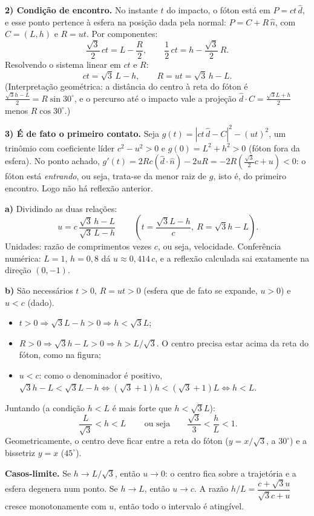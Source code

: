 \documentclass{article}%
\begin{document}
\textbf{2) Condição de encontro.} No instante $t$ do impacto, o fóton está em $P=ct\,\hat d$, e esse ponto pertence à esfera na posição dada pela normal: $P=C+R\,\hat n$, com $C=(L,h)$ e $R=ut$. Por componentes:
\[
\frac{\sqrt3}{2}\,ct=L-\frac{R}{2},\qquad \frac12\,ct=h-\frac{\sqrt3}{2}\,R .
\]
Resolvendo o sistema linear em $ct$ e $R$:
\[
ct=\sqrt3\,L-h,\qquad R=ut=\sqrt3\,h-L .
\]
(Interpretação geométrica: a distância do centro à reta do fóton é $\tfrac{\sqrt3h-L}{2}=R\sin30^\circ$, e o percurso até o impacto vale a projeção $\hat d\cdot C=\tfrac{\sqrt3L+h}{2}$ menos $R\cos30^\circ$.)

\textbf{3) É de fato o primeiro contato.} Seja $g(t)=|ct\,\hat d-C|^2-(ut)^2$, um trinômio com coeficiente líder $c^2-u^2>0$ e $g(0)=L^2+h^2>0$ (fóton fora da esfera). No ponto achado, $g'(t)=2Rc(\hat d\cdot\hat n)-2uR=-2R\left(\tfrac{\sqrt3}{2}c+u\right)<0$: o fóton está \emph{entrando}, ou seja, trata-se da menor raiz de $g$, isto é, do primeiro encontro. Logo não há reflexão anterior.

\textbf{a)} Dividindo as duas relações:
\[
\boxed{\,u=c\,\frac{\sqrt3\,h-L}{\sqrt3\,L-h}\,}
\qquad\left(t=\frac{\sqrt3L-h}{c},\ R=\sqrt3h-L\right).
\]
Unidades: razão de comprimentos vezes $c$, ou seja, velocidade. Conferência numérica: $L=1$, $h=0{,}8$ dá $u\approx0{,}414\,c$, e a reflexão calculada sai exatamente na direção $(0,-1)$.

\textbf{b)} São necessários $t>0$, $R=ut>0$ (esfera que de fato se expande, $u>0$) e $u<c$ (dado).
\begin{itemize}
\item $t>0 \Rightarrow \sqrt3L-h>0 \Rightarrow h<\sqrt3L$;
\item $R>0 \Rightarrow \sqrt3h-L>0 \Rightarrow h>L/\sqrt3$. O centro precisa estar acima da reta do fóton, como na figura;
\item $u<c$: como o denominador é positivo, $\sqrt3h-L<\sqrt3L-h \Leftrightarrow (\sqrt3+1)h<(\sqrt3+1)L \Leftrightarrow h<L$.
\end{itemize}
Juntando (a condição $h<L$ é mais forte que $h<\sqrt3L$):
\[
\boxed{\,\frac{L}{\sqrt3}<h<L\,}\qquad\text{ou seja}\qquad \frac{\sqrt3}{3}<\frac hL<1 .
\]
Geometricamente, o centro deve ficar entre a reta do fóton ($y=x/\sqrt3$, a $30^\circ$) e a bissetriz $y=x$ ($45^\circ$).

\textbf{Casos-limite.} Se $h\to L/\sqrt3$, então $u\to0$: o centro fica sobre a trajetória e a esfera degenera num ponto. Se $h\to L$, então $u\to c$. A razão $h/L=\dfrac{c+\sqrt3u}{\sqrt3c+u}$ cresce monotonamente com $u$, então todo o intervalo é atingível.
\end{document}
